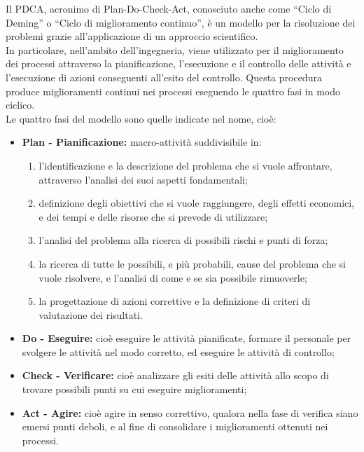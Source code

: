 
 \label{app:pdca}
Il PDCA, acronimo di Plan-Do-Check-Act, conosciuto anche come “Ciclo di Deming” o “Ciclo di miglioramento continuo”, è un modello per la risoluzione dei problemi grazie all'applicazione di un approccio scientifico.\\
In particolare, nell'ambito dell'ingegneria, viene utilizzato per il miglioramento dei processi attraverso la pianificazione, l'esecuzione e il controllo delle attività e l'esecuzione di azioni conseguenti all'esito del controllo. Questa procedura produce miglioramenti continui nei processi eseguendo le quattro fasi in modo ciclico.\\
Le quattro fasi del modello sono quelle indicate nel nome, cioè:
\begin{itemize}
	\item \textbf{Plan - Pianificazione:} macro-attività suddivisibile in:
		\begin{enumerate}
		\item l'identificazione e la descrizione del problema che si vuole affrontare, attraverso l'analisi dei suoi aspetti fondamentali;
		\item definizione degli obiettivi che si vuole raggiungere, degli effetti economici, e dei tempi e delle risorse che si prevede di utilizzare;
		\item l'analisi del problema alla ricerca di possibili rischi e punti di forza;
		\item la ricerca di tutte le possibili, e più probabili, cause del problema che si vuole risolvere, e l'analisi di come e se sia possibile rimuoverle;
		\item la progettazione di azioni correttive e la definizione di criteri di valutazione dei risultati.
		\end{enumerate}
	\item \textbf{Do - Eseguire:} cioè eseguire le attività pianificate, formare il personale per svolgere le attività nel modo corretto, ed eseguire le attività di controllo;
	\item \textbf{Check - Verificare:} cioè analizzare gli esiti delle attività allo scopo di trovare possibili punti su cui eseguire miglioramenti;
	\item \textbf{Act - Agire:} cioè agire in senso correttivo, qualora nella fase di verifica siano emersi punti deboli, e al fine di consolidare i miglioramenti ottenuti nei processi.
\end{itemize}

